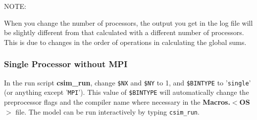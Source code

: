 \begin{Ventry}{NOTE:}
\item[NOTE]

When you change the number of processors, the output you get in the log
file will be slightly different from that calculated with a different
number of processors.  This is due to changes in the order of operations
in calculating the global sums.
\end{Ventry}

\subsubsection{Single Processor without MPI}
\label{single_pe_no_mpi}

In the run script {\bf csim\_run}, change {\tt \$NX} and {\tt \$NY} to 1,
and {\tt \$BINTYPE} to '{\tt single}' (or anything except '{\tt MPI}').
This value of {\tt \$BINTYPE} will automatically change the preprocessor
flags and the compiler name where necessary in the {\bf Macros.$<$OS$>$}
file.  The model can be run interactively by typing {\tt csim\_run}.  
